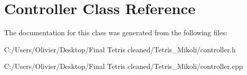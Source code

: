 \section{Controller Class Reference}
\label{class_controller}


The documentation for this class was generated from the following files\+:\begin{DoxyCompactItemize}
\item 
C\+:/\+Users/\+Olivier/\+Desktop/\+Final Tetris cleaned/\+Tetris\+\_\+\+Mikoli/controller.\+h\item 
C\+:/\+Users/\+Olivier/\+Desktop/\+Final Tetris cleaned/\+Tetris\+\_\+\+Mikoli/controller.\+cpp\end{DoxyCompactItemize}

